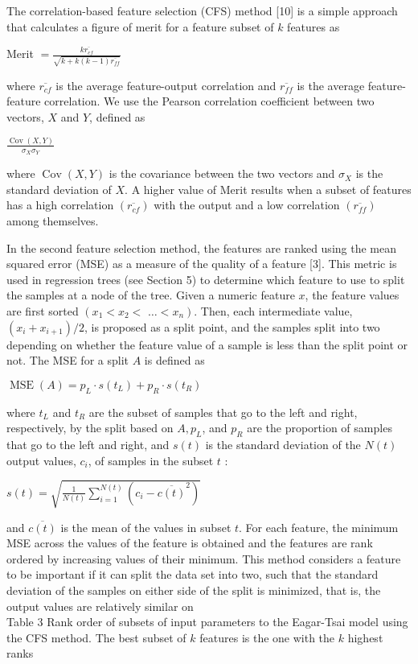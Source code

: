 \documentclass[10pt]{article}
\begin{document}
The correlation-based feature selection (CFS) method [10] is a simple approach that calculates a figure of merit for a feature subset of $k$ features as

Merit $=\frac{k \overline{r_{c f}}}{\sqrt{k+k(k-1) \overline{r_{f f}}}}$

where $\overline{r_{c f}}$ is the average feature-output correlation and $\overline{r_{f f}}$ is the average feature-feature correlation. We use the Pearson correlation coefficient between two vectors, $X$ and $Y$, defined as

$\frac{\operatorname{Cov}(X, Y)}{\sigma_{X} \sigma_{Y}}$

where $\operatorname{Cov}(X, Y)$ is the covariance between the two vectors and $\sigma_{X}$ is the standard deviation of $X$. A higher value of Merit results when a subset of features has a high correlation $\left(\overline{r_{c f}}\right)$ with the output and a low correlation $\left(\overline{r_{f f}}\right)$ among themselves.

In the second feature selection method, the features are ranked using the mean squared error (MSE) as a measure of the quality of a feature [3]. This metric is used in regression trees (see Section 5) to determine which feature to use to split the samples at a node of the tree. Given a numeric feature $x$, the feature values are first sorted $\left(x_{1}<x_{2}<\right.$ $\left.\ldots<x_{n}\right)$. Then, each intermediate value, $\left(x_{i}+x_{i+1}\right) / 2$, is proposed as a split point, and the samples split into two depending on whether the feature value of a sample is less than the split point or not. The MSE for a split $A$ is defined as

$\operatorname{MSE}(A)=p_{L} \cdot s\left(t_{L}\right)+p_{R} \cdot s\left(t_{R}\right)$

where $t_{L}$ and $t_{R}$ are the subset of samples that go to the left and right, respectively, by the split based on $A, p_{L}$, and $p_{R}$ are the proportion of samples that go to the left and right, and $s(t)$ is the standard deviation of the $N(t)$ output values, $c_{i}$, of samples in the subset $t$ :

$s(t)=\sqrt{\frac{1}{N(t)} \sum_{i=1}^{N(t)}\left(c_{i}-\overline{c(t)}^{2}\right)}$

and $\overline{c(t)}$ is the mean of the values in subset $t$. For each feature, the minimum MSE across the values of the feature is obtained and the features are rank ordered by increasing values of their minimum. This method considers a feature to be important if it can split the data set into two, such that the standard deviation of the samples on either side of the split is minimized, that is, the output values are relatively similar on\\
Table 3 Rank order of subsets of input parameters to the Eagar-Tsai model using the CFS method. The best subset of $k$ features is the one with the $k$ highest ranks
\end{document}

